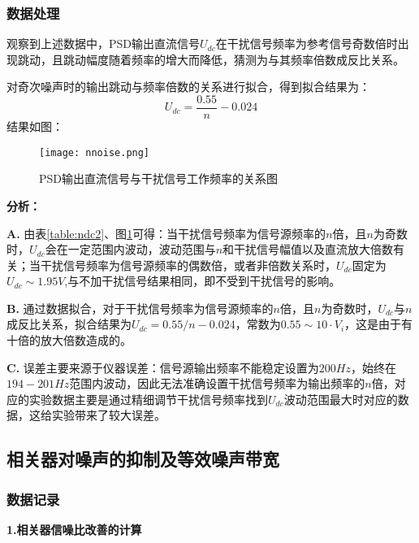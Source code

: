 \documentclass{whureport}
\begin{document}
\begin{multicols}{2}
\subsubsection{数据处理}
观察到上述数据中，PSD输出直流信号$U_{dc}$在干扰信号频率为参考信号奇数倍时出现跳动，且跳动幅度随着频率的增大而降低，猜测为与其频率倍数成反比关系。

对奇次噪声时的输出跳动与频率倍数的关系进行拟合，得到拟合结果为：
\begin{equation}
	U_{dc} = \frac{0.55}{n} - 0.024
\end{equation}
结果如图：
\begin{figure}[H]
	\centering
	\texttt{[image: nnoise.png]}
	\caption{PSD输出直流信号与干扰信号工作频率的关系图}	
	\label{fig:ndc2}
\end{figure}
\textbf{分析：}

\textbf{A.} 由表\ref{table:ndc2}、图\ref{fig:ndc2}可得：当干扰信号频率为信号源频率的$n$倍，且$n$为奇数时，$U_{dc}$会在一定范围内波动，波动范围与$n$和干扰信号幅值以及直流放大倍数有关；当干扰信号频率为信号源频率的偶数倍，或者非倍数关系时，$U_{dc}$固定为$U_{dc}\sim  1.95 V$,与不加干扰信号结果相同，即不受到干扰信号的影响。

\textbf{B.} 通过数据拟合，对于干扰信号频率为信号源频率的$n$倍，且$n$为奇数时，$U_{dc}$与$n$成反比关系，拟合结果为$U_{dc} = 0.55/n - 0.024$，常数为$0.55\sim 10\cdot V_i$，这是由于有十倍的放大倍数造成的。

\textbf{C.} 误差主要来源于仪器误差：信号源输出频率不能稳定设置为$200\unit{Hz}$，始终在$194-201\unit{Hz}$范围内波动，因此无法准确设置干扰信号频率为输出频率的$n$倍，对应的实验数据主要是通过精细调节干扰信号频率找到$U_{dc}$波动范围最大时对应的数据，这给实验带来了较大误差。


\subsection{相关器对噪声的抑制及等效噪声带宽}
\subsubsection{数据记录}
\textbf{1.相关器信噪比改善的计算}


\end{multicols}
\end{document}
